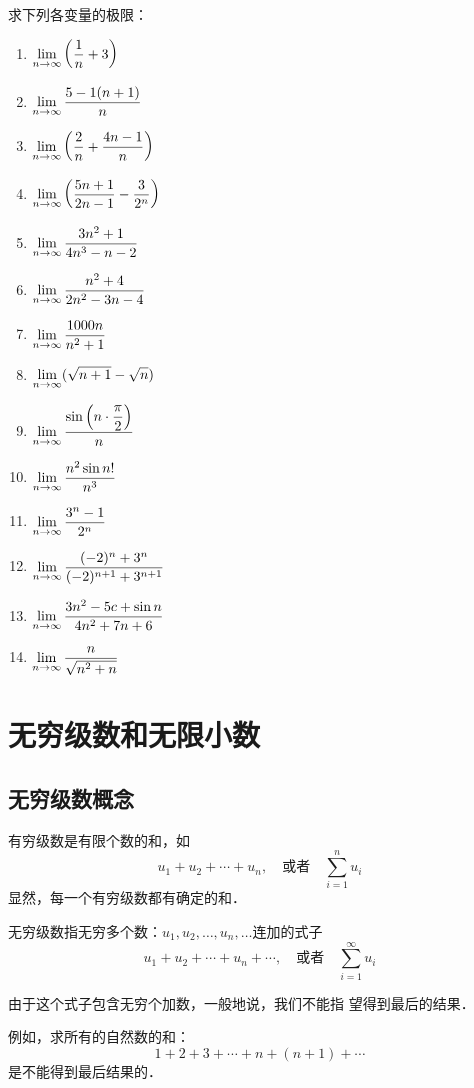 求下列各变量的极限：
\begin{multicols}{2}
\begin{enumerate}
\item $\displaystyle\lim_{n\to\infty}\left(\dfrac{1}{n}+3\right)$
\item  $\displaystyle\lim_{n\to\infty} \dfrac{5-1(n+1)}{n}$ 
\item  $\displaystyle\lim_{n\to\infty}\left(\dfrac{2}{n}+\dfrac{4 n-1}{n}\right)$
\item  $\displaystyle\lim_{n\to\infty}\left(\dfrac{5 n+1}{2 n-1}-\dfrac{3}{2^{n}}\right)$
\item $\displaystyle\lim_{n\to\infty} \dfrac{3 n^{2}+1}{4 n^{3}-n-2} $
\item $\displaystyle\lim_{n\to\infty} \dfrac{n^{2}+4}{2 n^{2}-3 n-4}$
\item $ \displaystyle\lim_{n\to\infty} \dfrac{1000 n}{n^{2}+1}$
\item  $\displaystyle\lim_{n\to\infty}(\sqrt{n+1}-\sqrt{n})$
\item  $\displaystyle\lim_{n\to\infty} \dfrac{\sin \left(n \cdot \dfrac{\pi}{2}\right)}{n}$
\item  $\displaystyle\lim_{n\to\infty} \dfrac{n^{2} \sin n !}{n^{3}}$
\item  $\displaystyle\lim_{n\to\infty} \dfrac{3^{n}-1}{2^{n}}$
\item  $\displaystyle\lim_{n\to\infty} \dfrac{(-2)^{n}+3^{n}}{(-2)^{n+1}+3^{n+1}}$ 
\item  $\displaystyle\lim_{n\to\infty} \dfrac{3n^2-5c+\sin n}{4n^2+7n+6}$ 
\item  $\displaystyle\lim_{n\to\infty} \dfrac{n}{\sqrt{n^2+n}}$ 
\end{enumerate}    
\end{multicols}

\section{无穷级数和无限小数}
\subsection{无穷级数概念}

有穷级数是有限个数的和，如
$$u_1+u_2+\cdots+u_n,\quad \text{或者}\quad \sum^n_{i=1}u_i$$
显然，每一个有穷级数都有确定的和．

无穷级数指无穷多个数：$u_1,u_2,\ldots,u_n,\ldots$连加的式子
$$u_1+u_2+\cdots+u_n+\cdots,\quad \text{或者}\quad \sum^{\infty}_{i=1}u_i$$

由于这个式子包含无穷个加数，一般地说，我们不能指
望得到最后的结果．

例如，求所有的自然数的和：
\[1+2+3+\cdots+n+(n+1)+\cdots\]
是不能得到最后结果的．

